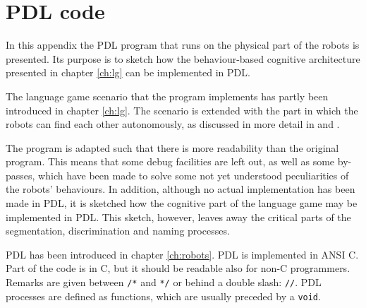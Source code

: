 \chapter{PDL code}\label{a:pdl}

In this appendix the PDL program that runs on the physical part of the robots is presented. Its purpose is to sketch how the behaviour-based cognitive architecture presented in chapter \ref{ch:lg} can be implemented in PDL.

The language game scenario that the program implements has partly been introduced in chapter \ref{ch:lg}. The scenario is extended with the part in which the robots can find each other autonomously, as discussed in more detail in \citet{steelsvogt:1997} and \citet{vogt:1997}.


The program is adapted such that there is more readability than the original program. This means that some debug facilities are left out, as well as some by-passes, which have been made to solve some not yet understood peculiarities of the robots' behaviours. In addition, although no actual implementation has been made in PDL, it is sketched how the cognitive part of the language game may be implemented in PDL. This sketch, however, leaves away the critical parts of the segmentation, discrimination and naming processes.


PDL has been introduced in chapter \ref{ch:robots}. PDL is implemented in ANSI C. Part of the code is in C, but it should be readable also for non-C programmers. Remarks are given between \texttt{/*} and \texttt{*/} or behind a double slash: \texttt{//}. PDL processes are defined as functions, which are usually preceded by a \texttt{void}.


